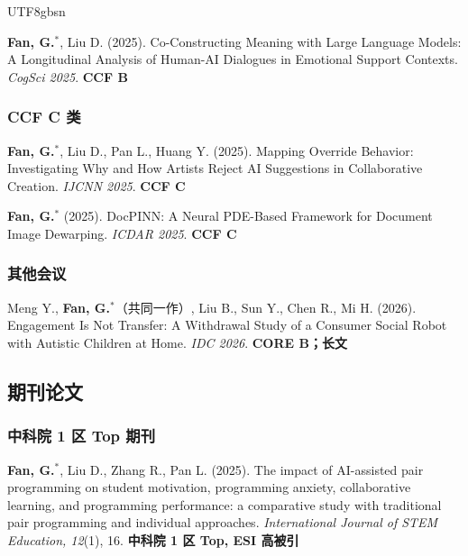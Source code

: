 \documentclass[a4paper,10pt]{article}
\newcommand{\pubitem}[1]{\item #1}
\begin{document}
\begin{CJK*}{UTF8}{gbsn}
\begin{enumerate}[label={[C\arabic*]}, resume]
    \pubitem{\textbf{Fan, G.}$^*$, Liu D. (2025). Co-Constructing Meaning with Large Language Models: A Longitudinal Analysis of Human-AI Dialogues in Emotional Support Contexts. \textit{CogSci 2025}. \textbf{CCF B}}
\end{enumerate}

\subsubsection*{CCF C 类}

\begin{enumerate}[label={[C\arabic*]}, resume]
    \pubitem{\textbf{Fan, G.}$^*$, Liu D., Pan L., Huang Y. (2025). Mapping Override Behavior: Investigating Why and How Artists Reject AI Suggestions in Collaborative Creation. \textit{IJCNN 2025}. \textbf{CCF C}}
    
    \pubitem{\textbf{Fan, G.}$^*$ (2025). DocPINN: A Neural PDE-Based Framework for Document Image Dewarping. \textit{ICDAR 2025}. \textbf{CCF C}}
\end{enumerate}

\subsubsection*{其他会议}

\begin{enumerate}[label={[C\arabic*]}, resume]
    \pubitem{Meng Y., \textbf{Fan, G.}$^*$（共同一作）, Liu B., Sun Y., Chen R., Mi H. (2026). Engagement Is Not Transfer: A Withdrawal Study of a Consumer Social Robot with Autistic Children at Home. \textit{IDC 2026}. \textbf{CORE B；长文}}
\end{enumerate}

\subsection*{期刊论文}

\subsubsection*{中科院 1 区 Top 期刊}

\begin{enumerate}[label={[J\arabic*]}]
    \pubitem{\textbf{Fan, G.}$^*$, Liu D., Zhang R., Pan L. (2025). The impact of AI-assisted pair programming on student motivation, programming anxiety, collaborative learning, and programming performance: a comparative study with traditional pair programming and individual approaches. \textit{International Journal of STEM Education, 12}(1), 16. \textbf{中科院 1 区 Top, ESI 高被引}}
    

\end{enumerate}
\end{CJK*}
\end{document}
